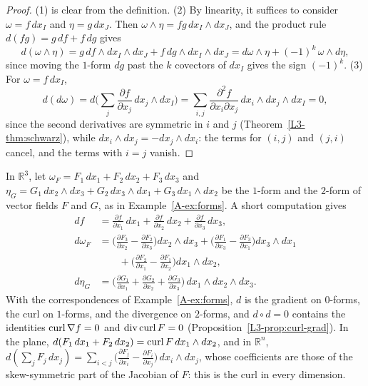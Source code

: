 \begin{proof}
    (1) is clear from the definition. (2) By linearity, it suffices to consider $\omega = f\, dx_I$ and $\eta = g\, dx_J$. Then $\omega \wedge \eta = fg\, dx_I \wedge dx_J$, and the product rule $d(fg) = g\, df + f\, dg$ gives
    \[d(\omega \wedge \eta) = g\, df \wedge dx_I \wedge dx_J + f\, dg \wedge dx_I \wedge dx_J = d\omega \wedge \eta + (-1)^k\, \omega \wedge d\eta,\]
    since moving the $1$-form $dg$ past the $k$ covectors of $dx_I$ gives the sign $(-1)^k$. (3) For $\omega = f\, dx_I$,
    \[d(d\omega) = d\Big(\sum_j \frac{\partial f}{\partial x_j}\, dx_j \wedge dx_I\Big) = \sum_{i,j} \frac{\partial^2 f}{\partial x_i \partial x_j}\, dx_i \wedge dx_j \wedge dx_I = 0,\]
    since the second derivatives are symmetric in $i$ and $j$ (Theorem~\ref{L3-thm:schwarz}), while $dx_i \wedge dx_j = -dx_j \wedge dx_i$: the terms for $(i, j)$ and $(j, i)$ cancel, and the terms with $i = j$ vanish.
\end{proof}

\begin{example}\label{A-ex:vector-calculus-forms}
    In $\mathbb{R}^3$, let $\omega_F = F_1\, dx_1 + F_2\, dx_2 + F_3\, dx_3$ and $\eta_G = G_1\, dx_2 \wedge dx_3 + G_2\, dx_3 \wedge dx_1 + G_3\, dx_1 \wedge dx_2$ be the $1$-form and the $2$-form of vector fields $F$ and $G$, as in Example~\ref{A-ex:forms}. A short computation gives
    \begin{align*}
        df &= \tfrac{\partial f}{\partial x_1}\, dx_1 + \tfrac{\partial f}{\partial x_2}\, dx_2 + \tfrac{\partial f}{\partial x_3}\, dx_3, \\
        d\omega_F &= \Big(\tfrac{\partial F_3}{\partial x_2} - \tfrac{\partial F_2}{\partial x_3}\Big) dx_2 \wedge dx_3 + \Big(\tfrac{\partial F_1}{\partial x_3} - \tfrac{\partial F_3}{\partial x_1}\Big) dx_3 \wedge dx_1 \\
        &\qquad + \Big(\tfrac{\partial F_2}{\partial x_1} - \tfrac{\partial F_1}{\partial x_2}\Big) dx_1 \wedge dx_2, \\
        d\eta_G &= \Big(\tfrac{\partial G_1}{\partial x_1} + \tfrac{\partial G_2}{\partial x_2} + \tfrac{\partial G_3}{\partial x_3}\Big)\, dx_1 \wedge dx_2 \wedge dx_3.
    \end{align*}
    With the correspondences of Example~\ref{A-ex:forms}, $d$ is the gradient on $0$-forms, the curl on $1$-forms, and the divergence on $2$-forms, and $d \circ d = 0$ contains the identities $\operatorname{curl} \nabla f = 0$ and $\operatorname{div} \operatorname{curl} F = 0$ (Proposition~\ref{L3-prop:curl-grad}). In the plane, $d(F_1\, dx_1 + F_2\, dx_2) = \operatorname{curl} F\, dx_1 \wedge dx_2$, and in $\mathbb{R}^n$, $d(\sum_j F_j\, dx_j) = \sum_{i < j} \big(\frac{\partial F_j}{\partial x_i} - \frac{\partial F_i}{\partial x_j}\big)\, dx_i \wedge dx_j$, whose coefficients are those of the skew-symmetric part of the Jacobian of $F$: this is the curl in every dimension.
\end{example}

